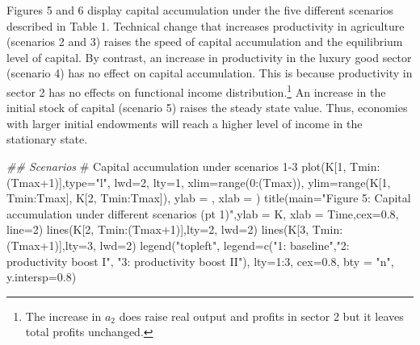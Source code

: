 \documentclass[
  letterpaper,
  DIV=11,
  numbers=noendperiod]{scrreprt}
\newenvironment{Shaded}{\begin{snugshade}}{\end{snugshade}}
\newcommand{\AttributeTok}[1]{\textcolor[rgb]{0.40,0.45,0.13}{#1}}
\newcommand{\CommentTok}[1]{\textcolor[rgb]{0.37,0.37,0.37}{#1}}
\newcommand{\DecValTok}[1]{\textcolor[rgb]{0.68,0.00,0.00}{#1}}
\newcommand{\DocumentationTok}[1]{\textcolor[rgb]{0.37,0.37,0.37}{\textit{#1}}}
\newcommand{\FloatTok}[1]{\textcolor[rgb]{0.68,0.00,0.00}{#1}}
\newcommand{\FunctionTok}[1]{\textcolor[rgb]{0.28,0.35,0.67}{#1}}
\newcommand{\NormalTok}[1]{\textcolor[rgb]{0.00,0.23,0.31}{#1}}
\newcommand{\SpecialCharTok}[1]{\textcolor[rgb]{0.37,0.37,0.37}{#1}}
\newcommand{\StringTok}[1]{\textcolor[rgb]{0.13,0.47,0.30}{#1}}
\begin{document}
Figures 5 and 6 display capital accumulation under the five different
scenarios described in Table 1. Technical change that increases
productivity in agriculture (scenarios 2 and 3) raises the speed of
capital accumulation and the equilibrium level of capital. By contrast,
an increase in productivity in the luxury good sector (scenario 4) has
no effect on capital accumulation. This is because productivity in
sector 2 has no effects on functional income distribution.\footnote{The
  increase in \(a_2\) does raise real output and profits in sector 2 but
  it leaves total profits unchanged.} An increase in the initial stock
of capital (scenario 5) raises the steady state value. Thus, economies
with larger initial endowments will reach a higher level of income in
the stationary state.

\begin{Shaded}
\begin{Highlighting}[]
\DocumentationTok{\#\# Scenarios}
\CommentTok{\# Capital accumulation under scenarios 1{-}3}
\FunctionTok{plot}\NormalTok{(K[}\DecValTok{1}\NormalTok{, Tmin}\SpecialCharTok{:}\NormalTok{(Tmax}\SpecialCharTok{+}\DecValTok{1}\NormalTok{)],}\AttributeTok{type=}\StringTok{"l"}\NormalTok{, }\AttributeTok{lwd=}\DecValTok{2}\NormalTok{, }\AttributeTok{lty=}\DecValTok{1}\NormalTok{, }\AttributeTok{xlim=}\FunctionTok{range}\NormalTok{(}\DecValTok{0}\SpecialCharTok{:}\NormalTok{(Tmax)), }\AttributeTok{ylim=}\FunctionTok{range}\NormalTok{(K[}\DecValTok{1}\NormalTok{, Tmin}\SpecialCharTok{:}\NormalTok{Tmax], K[}\DecValTok{2}\NormalTok{, Tmin}\SpecialCharTok{:}\NormalTok{Tmax]), }\AttributeTok{ylab =} \StringTok{\textquotesingle{}\textquotesingle{}}\NormalTok{, }\AttributeTok{xlab =} \StringTok{\textquotesingle{}\textquotesingle{}}\NormalTok{)}
\FunctionTok{title}\NormalTok{(}\AttributeTok{main=}\StringTok{"Figure 5: Capital accumulation under different scenarios (pt 1)"}\NormalTok{,}\AttributeTok{ylab =} \StringTok{\textquotesingle{}K\textquotesingle{}}\NormalTok{, }\AttributeTok{xlab =} \StringTok{\textquotesingle{}Time\textquotesingle{}}\NormalTok{,}\AttributeTok{cex=}\FloatTok{0.8}\NormalTok{, }\AttributeTok{line=}\DecValTok{2}\NormalTok{)}
\FunctionTok{lines}\NormalTok{(K[}\DecValTok{2}\NormalTok{, Tmin}\SpecialCharTok{:}\NormalTok{(Tmax}\SpecialCharTok{+}\DecValTok{1}\NormalTok{)],}\AttributeTok{lty=}\DecValTok{2}\NormalTok{, }\AttributeTok{lwd=}\DecValTok{2}\NormalTok{)}
\FunctionTok{lines}\NormalTok{(K[}\DecValTok{3}\NormalTok{, Tmin}\SpecialCharTok{:}\NormalTok{(Tmax}\SpecialCharTok{+}\DecValTok{1}\NormalTok{)],}\AttributeTok{lty=}\DecValTok{3}\NormalTok{, }\AttributeTok{lwd=}\DecValTok{2}\NormalTok{)}
\FunctionTok{legend}\NormalTok{(}\StringTok{"topleft"}\NormalTok{, }\AttributeTok{legend=}\FunctionTok{c}\NormalTok{(}\StringTok{"1: baseline"}\NormalTok{,}\StringTok{"2: productivity boost I"}\NormalTok{, }\StringTok{"3: productivity boost II"}\NormalTok{), }\AttributeTok{lty=}\DecValTok{1}\SpecialCharTok{:}\DecValTok{3}\NormalTok{, }\AttributeTok{cex=}\FloatTok{0.8}\NormalTok{, }\AttributeTok{bty =} \StringTok{"n"}\NormalTok{, }\AttributeTok{y.intersp=}\FloatTok{0.8}\NormalTok{)}
\end{Highlighting}
\end{Shaded}
\end{document}
